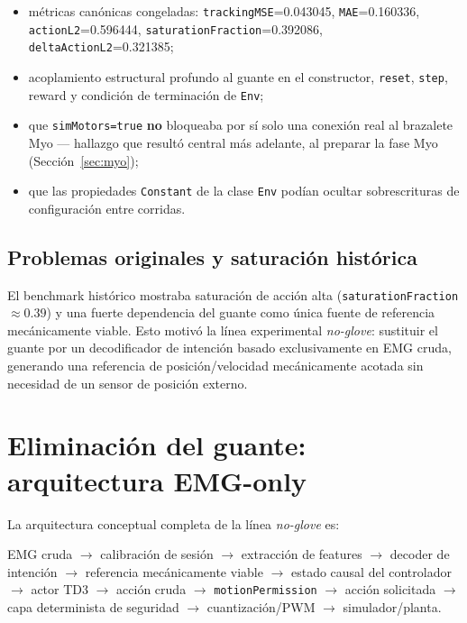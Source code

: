 \documentclass[11pt,a4paper]{article}
\begin{document}
\begin{itemize}
  \item métricas canónicas congeladas: \texttt{trackingMSE}=0.043045,
    \texttt{MAE}=0.160336, \texttt{actionL2}=0.596444,
    \texttt{saturationFraction}=0.392086, \texttt{deltaActionL2}=0.321385;
  \item acoplamiento estructural profundo al guante en el constructor, \texttt{reset},
    \texttt{step}, reward y condición de terminación de \texttt{Env};
  \item que \texttt{simMotors=true} \textbf{no} bloqueaba por sí solo una conexión real
    al brazalete Myo --- hallazgo que resultó central más adelante, al preparar la
    fase Myo (Sección~\ref{sec:myo});
  \item que las propiedades \texttt{Constant} de la clase \texttt{Env} podían ocultar
    sobrescrituras de configuración entre corridas.
\end{itemize}

\subsection{Problemas originales y saturación histórica}

El benchmark histórico mostraba saturación de acción alta (\texttt{saturationFraction}
$\approx 0.39$) y una fuerte dependencia del guante como única fuente de referencia
mecánicamente viable. Esto motivó la línea experimental \emph{no-glove}: sustituir el
guante por un decodificador de intención basado exclusivamente en EMG cruda, generando
una referencia de posición/velocidad mecánicamente acotada sin necesidad de un sensor
de posición externo.

\section{Eliminación del guante: arquitectura EMG-only}

La arquitectura conceptual completa de la línea \emph{no-glove} es:

\begin{center}
EMG cruda $\to$ calibración de sesión $\to$ extracción de features $\to$
decoder de intención $\to$ referencia mecánicamente viable
$\to$ estado causal del controlador $\to$ actor TD3 $\to$ acción cruda
$\to$ \texttt{motionPermission} $\to$ acción solicitada
$\to$ capa determinista de seguridad $\to$ cuantización/PWM $\to$ simulador/planta.
\end{center}
\end{document}
